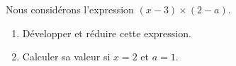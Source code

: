 
\begin{exercice}\label{exo2smath-0233}

    Nous considérons l'expression \( (x-3)\times (2-a)\).
    \begin{enumerate}
        \item
            Développer et réduire cette expression.
        \item
            Calculer sa valeur si \( x=2\) et \( a=1\).
    \end{enumerate}

\end{exercice}
